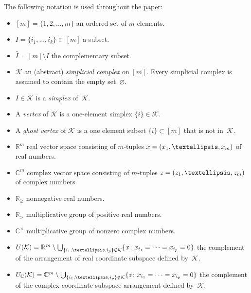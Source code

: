 \documentclass[a4paper]{amsart}
\theoremstyle{definition}
\theoremstyle{remark}
\numberwithin{equation}{section}
\def\R{\mathbb R}
\def\C{\mathbb C}
\def\R{\mathbb R}
\def\sK{\mathcal K}
\newcommand{\mb}[1]{{\textbf {\textit#1}}}
\renewcommand{\ge}{\geqslant}
\newcommand{\<}{\langle}
\renewcommand{\>}{\rangle}
\begin{document}
The following notation is used throughout the paper:
\begin{itemize}
\item
$[m]=\{1,2,\ldots,m\}$ an ordered set of $m$ elements.

\item
$I=\{i_1,\ldots,i_k\}\subset [m]$ a subset.

\item
$\widehat I=[m]\setminus I$ the complementary subset.

\item
$\mathcal K$ an (abstract) \emph{simplicial complex} on $[m]$. 
Every simplicial complex is assumed to contain the empty set~$\varnothing$.

\item
$I\in\sK$ is a \emph{simplex} of~$\sK$.

\item
A \emph{vertex} of $\sK$ is a one-element simplex $\{i\}\in\sK$.

\item
A \emph{ghost vertex} of $\sK$ is a one element subset $\{i\}\subset[m]$ that is not  in~$\sK$.

\item
$\R^m$ real vector space consisting of $m$-tuples $\mb x=(x_1,\ldots,x_m)$ of real numbers.

\item
$\C^m$ complex vector space consisting of $m$-tuples $\mb z=(z_1,\ldots,z_m)$ of complex numbers.

\item
$\R_\ge$ nonnegative real numbers.

\item
$\R_>$ multiplicative group of positive real numbers.

\item
$\C^\times$ multiplicative group of nonzero complex numbers.

\item
$U(\mathcal K)=\R^m\setminus\bigcup_{\{i_1,\ldots,i_p\}\notin\mathcal K}
  \{\mb x\colon x_{i_1}=\cdots=x_{i_p}=0\}$ the complement of the arrangement of real coordinate subspace defined by~$\sK$.
  
\item
$U_\C(\mathcal K)=\C^m\setminus\bigcup_{\{i_1,\ldots,i_p\}\notin\mathcal K}
  \{\mb z\colon x_{i_1}=\cdots=x_{i_p}=0\}$ the complement of the complex coordinate subspace arrangement defined by~$\sK$. 


\end{itemize}
\end{document}
